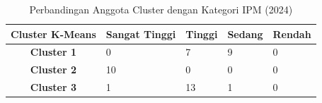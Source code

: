 \begin{table}[H]
\centering
\caption{Perbandingan Anggota Cluster dengan Kategori IPM (2024)} \label{tab:ipm_cross_2024}
\begin{tabular}{|c|p{2cm}|p{2cm}|p{2cm}|p{2cm}|}
\hline
\textbf{Cluster K-Means} & \textbf{Sangat Tinggi} & \textbf{Tinggi} & \textbf{Sedang} & \textbf{Rendah} \\ \hline
\textbf{Cluster 1} & 0 & 7 & 9 & 0 \\ \hline
\textbf{Cluster 2} & 10 & 0 & 0 & 0 \\ \hline
\textbf{Cluster 3} & 1 & 13 & 1 & 0 \\ \hline
\end{tabular}
\end{table}